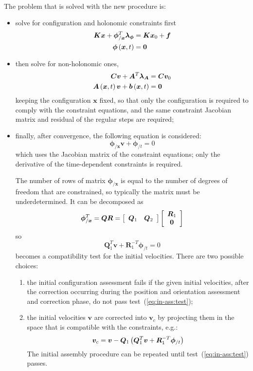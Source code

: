 \documentclass[10pt,dvips,fleqn,subeqn]{report}
\newcommand{\T}[1]{\bm{#1}}
\newcommand{\TT}[1]{\bm{#1}}
\begin{document}
The problem that is solved with the new procedure is:
\begin{itemize}
\item solve for configuration and holonomic constraints first
\begin{align}
	\TT{K} \T{x} + \T{\phi}_{/\T{x}}^T \T{\lambda}_{\T{\phi}}
		& = \TT{K} \T{x}_0 + \T{f} \\
	\T{\phi}\plbr{\T{x}, t} & = \T{0}
\end{align}

\item then solve for non-holonomic ones,
\begin{align}
	\TT{C} \T{v} + \TT{A}^T \T{\lambda}_{\TT{A}} & = \TT{C} \T{v}_0 \\
	\TT{A}\plbr{\T{x}, t} \T{v} + \T{b}\plbr{\T{x}, t} & = \T{0}
\end{align}
keeping the configuration $\T{x}$ fixed,
so that only the configuration is required to comply 
with the constraint equations, and the same constraint 
Jacobian matrix and residual of the regular steps are required;

\item
finally, after convergence, the following equation is considered:
\begin{equation}
	\T{\phi}_{/\T{x}} \T{v} + \T{\phi}_{/t} = 0
\end{equation}
which uses the Jacobian matrix of the constraint equations; 
only the derivative of the time-dependent constraints is required.

The number of rows of matrix $\T{\phi}_{/\T{x}}$ is equal to the number 
of degrees of freedom that are constrained, so typically the matrix 
must be underdetermined.
It can be decomposed as
\begin{equation}
	\T{\phi}_{/\T{x}}^T = \T{Q} \T{R}
		= \sqbr{\matr{cc}{\T{Q}_1 & \T{Q}_2}}\sqbr{\cvvect{\T{R}_1 \\ \T{0}}}
\end{equation}
so
\begin{equation}
	\T{Q}_1^T \T{v} + \T{R}_1^{-T} \T{\phi}_{/t} = 0
	\label{eq:in-ass:test}
\end{equation}
becomes a compatibility test for the initial velocities.
There are two possible choices:
\begin{enumerate}
\item the initial configuration assessment fails if the given 
initial velocities, after the correction occurring during the position 
and orientation assessment and correction phase, do not pass 
test~(\ref{eq:in-ass:test});
\item the initial velocities $\T{v}$ are corrected into $\T{v}_c$ 
by projecting them in the space that is compatible with the constraints, 
e.g.:
\begin{equation}
	\T{v}_c = \T{v} - \T{Q}_1 \plbr{\T{Q}_1^T \T{v} + \T{R}_1^{-T}\T{\phi}_{/t}}
\end{equation}
The initial assembly procedure can be repeated until 
test~(\ref{eq:in-ass:test}) passes.
\end{enumerate}
\end{itemize}
\end{document}

